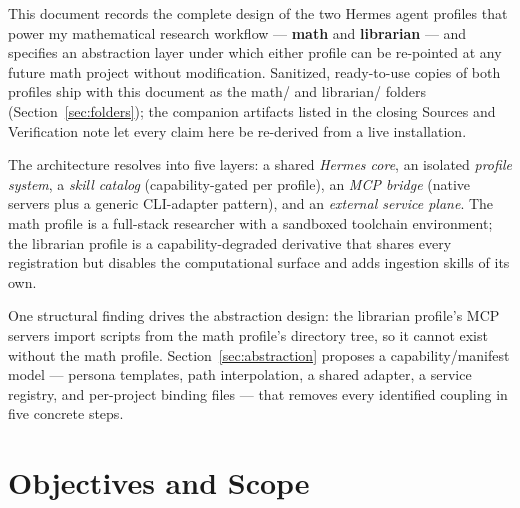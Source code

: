 \documentclass[10pt]{article}
\title{\Title}
\author{\Author}
\date{\Date}
\newcommand{\mono}[1]{{\ttfamily\small #1}}
\begin{document}
\begin{titlepage}
\maketitle
\end{titlepage}

\linespread{1.2}

\begin{executive}

This document records the complete design of the two Hermes agent profiles that power my
mathematical research workflow --- \textbf{\mono{math}} and \textbf{\mono{librarian}} --- and
specifies an abstraction layer under which either profile can be re-pointed at any future math
project without modification. Sanitized, ready-to-use copies of both profiles ship with this
document as the \mono{math/} and \mono{librarian/} folders (Section~\ref{sec:folders}); the
companion artifacts listed in the closing Sources and Verification note let every claim here be
re-derived from a live installation.

The architecture resolves into five layers: a shared \emph{Hermes core}, an isolated
\emph{profile system}, a \emph{skill catalog} (capability-gated per profile), an \emph{MCP bridge}
(native servers plus a generic CLI-adapter pattern), and an \emph{external service plane}. The math
profile is a full-stack researcher with a sandboxed toolchain environment; the librarian profile is
a capability-degraded derivative that shares every registration but disables the computational
surface and adds ingestion skills of its own.

One structural finding drives the abstraction design: the librarian profile's MCP servers import
scripts from the math profile's directory tree, so it cannot exist without the math profile. Section~\ref{sec:abstraction}
proposes a capability/manifest model --- persona templates, path interpolation, a shared adapter,
a service registry, and per-project binding files --- that removes every identified coupling in
five concrete steps.

\end{executive}

\tableofcontents
\newpage

\section{Objectives and Scope}\label{objectives}
\end{document}
